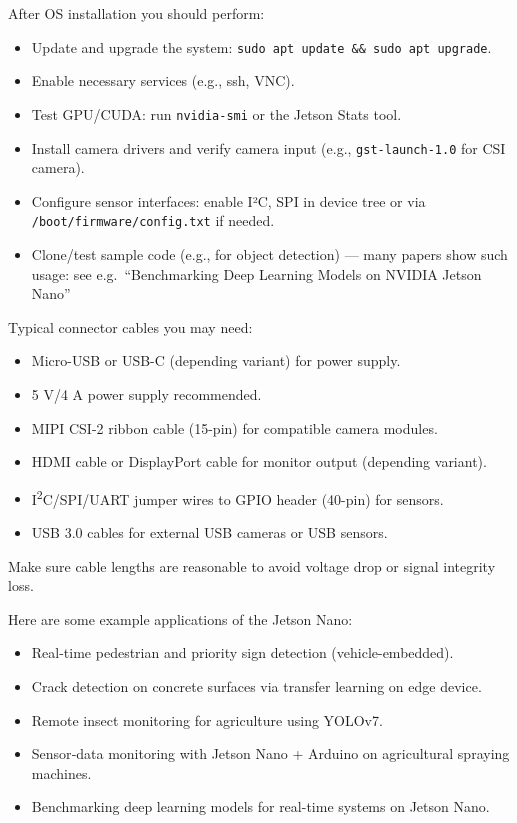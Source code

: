 {
After OS installation you should perform:  
\begin{itemize}
\item Update and upgrade the system: \texttt{sudo apt update \&\& sudo apt upgrade}.
\item Enable necessary services (e.g., ssh, VNC).
\item Test GPU/CUDA: run \texttt{nvidia-smi} or the Jetson Stats tool.
\item Install camera drivers and verify camera input (e.g., \texttt{gst-launch-1.0} for CSI camera).
\item Configure sensor interfaces: enable I²C, SPI in device tree or via \texttt{/boot/firmware/config.txt} if needed.
\item Clone/test sample code (e.g., for object detection) — many papers show such usage: see e.g.\ “Benchmarking Deep Learning Models on NVIDIA Jetson Nano”
\end{itemize}
}

{
Typical connector cables you may need:  
\begin{itemize}
\item Micro-USB or USB-C (depending variant) for power supply.  
\item 5 V/4 A power supply recommended.  
\item MIPI CSI-2 ribbon cable (15-pin) for compatible camera modules.  
\item HDMI cable or DisplayPort cable for monitor output (depending variant).  
\item I\textsuperscript{2}C/SPI/UART jumper wires to GPIO header (40-pin) for sensors.  
\item USB 3.0 cables for external USB cameras or USB sensors.  
\end{itemize}
Make sure cable lengths are reasonable to avoid voltage drop or signal integrity loss.
}

{
Here are some example applications of the Jetson Nano:
\begin{itemize}
\item Real-time pedestrian and priority sign detection (vehicle-embedded).\cite{Sarvajcz:2024}  
\item Crack detection on concrete surfaces via transfer learning on edge device. \cite{StudyTransferLearning:2024}
\item Remote insect monitoring for agriculture using YOLOv7. \cite{Doan:2024}
\item Sensor‐data monitoring with Jetson Nano + Arduino on agricultural spraying machines. \cite{AgriculturalSensor:2023} 
\item Benchmarking deep learning models for real-time systems on Jetson Nano.\cite{Swaminathan:2024}
\end{itemize}
}




